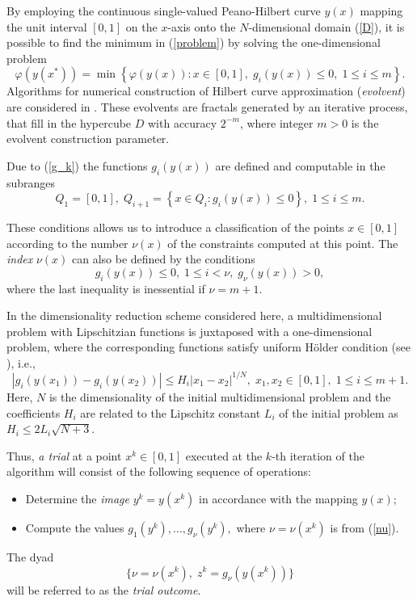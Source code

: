 \documentclass{llncs}
\begin{document}
By employing the continuous single-valued Peano-Hilbert curve $y(x)$ mapping the unit interval 
$[0,1]$ on the $x$-axis onto the $N$-dimensional domain (\ref{D}), it is possible to find the 
minimum in (\ref{problem}) by solving the one-dimensional problem
\[
\varphi(y(x^\ast))=\min \left\{\varphi(y(x)): x \in [0,1], \; g_i(y(x))\leq 0, \; 1 \leq i \leq m\right\}.
\]
Algorithms for numerical construction of Hilbert curve approximation (\textit{evolvent}) are 
considered in \cite{Strongin2013}. These evolvents are fractals generated by an iterative
process, that fill in the hypercube $D$ with accuracy $2^{-m}$, where integer $m>0$ is the evolvent construction parameter. 


Due to (\ref{g_k}) the functions $g_i(y(x))$ are defined 
and computable in the subranges 
\[
Q_1=[0,1], \; Q_{i+1}=\left\{x \in Q_i : g_i(y(x)) \leq 0 \right\}, \; 1 \leq i \leq m.
\]

These conditions allows us to introduce a classification of the points $x \in [0,1]$ according to 
the number $\nu (x)$ of the constraints computed at this point. The \textit{index} $\nu(x)$ can 
also be defined by the conditions
\begin{equation}\label{nu}
g_i(y(x)) \leq 0, \; 1 \leq i < \nu, \; g_\nu(y(x))>0,
\end{equation}
where the last inequality is inessential if $\nu=m+1$.

In the dimensionality reduction scheme considered here, a multidimensional problem with 
Lipschitzian functions is juxtaposed with a one-dimensional problem, where the corresponding 
functions satisfy uniform H{\"o}lder condition (see \cite{Strongin2013}), i.e.,
\[
\left|g_i(y(x_1))-g_i (y(x_2))\right| \leq H_i \left|x_1-x_2 \right|^{1/N}, \; x_1,x_2\in [0,1], \; 
1\leq i \leq m+1.
\]
Here, $N$ is the dimensionality of the initial multidimensional problem and the coefficients 
$H_i$ are related to the Lipschitz constant $L_i$ of the initial problem as $H_i \leq 2L_i 
\sqrt{N+3}$.

Thus, \textit{a trial} at a point $x^k \in [0,1]$ executed at the $k$-th iteration of the algorithm 
will consist of the following sequence of operations:
\begin{itemize}
	\item Determine the \textit{image} $y^k=y(x^k)$ in accordance with the mapping 
$y(x)$;
	\item Compute the values $g_1(y^k),..., g_\nu(y^k),$ where $\nu = \nu(x^k)$ is from 
(\ref{nu}). 
\end{itemize}
The dyad 
\begin{equation} \label{trial_result}
 \{ \nu=\nu(x^k), \; z^k=g_\nu(y(x^k)) \} 
\end{equation}
will be referred to as the \textit{trial outcome}.
\end{document}

